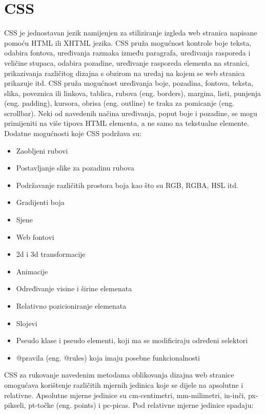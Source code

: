 \documentclass[12pt, oneside, onecolumn]{book}
\begin{document}
{\section{CSS}
CSS je jednostavan jezik namijenjen za stiliziranje izgleda web stranica napisane pomoću HTML ili XHTML jezika. CSS pruža mogućnost kontrole boje teksta, odabira fontova, uređivanja razmaka između paragrafa, uređivanja rasporeda i veličine stupaca, odabira pozadine, uređivanje rasporeda elementa na stranici, prikazivanja različitog dizajna s obzirom na uređaj na kojem se web stranica prikazuje itd. CSS pruža mogućnost uređivanja boje, pozadina, fontova, teksta, slika, poveznica ili linkova, tablica, rubova (eng. borders), margina, listi, punjenja (eng. padding), kursora, obrisa (eng. outline) te traka za pomicanje (eng. scrollbar). Neki od navedenih načina uređivanja, poput boje i pozadine, se mogu primijeniti na više tipova HTML elementa, a ne samo na tekstualne elemente. Dodatne mogućnosti koje CSS podržava su: 

\begin{itemize}
\item Zaobljeni rubovi
\item Postavljanje slike za pozadinu rubova
\item Podržavanje različitih prostora boja kao što su RGB, RGBA, HSL itd.
\item Gradijenti boja
\item Sjene
\item Web fontovi
\item 2d i 3d transformacije
\item Animacije
\item Određivanje visine i širine elemenata
\item Relativno pozicioniranje elemenata
\item Slojevi
\item Pseudo klase i pseudo elementi, koji ma se modificiraju određeni selektori
\item @pravila (eng. @rules) koja imaju posebne funkcionalnosti
\end{itemize}

CSS za rukovanje navedenim metodama oblikovanja dizajna web stranice omogućava korištenje različitih mjernih jedinica koje se dijele na apsolutne i relativne. Apsolutne mjerne jedinice su cm-centimetri, mm-milimetri, in-inči, px-pikseli, pt-točke (eng. points) i pc-picas. Pod relativne mjerne jedinice spadaju: 

}
\end{document}
